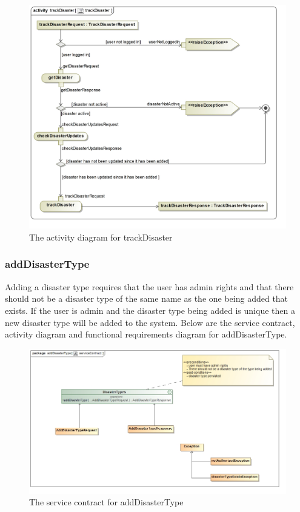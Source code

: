 \begin{figure}[H]
	\centering
	\includegraphics[width=1.0\textwidth]{../images/funcReq/trackDisasterActivityDiagram.jpg}
	\caption{The activity diagram for trackDisaster \label{overflow}}
\end{figure}

\subsubsection{addDisasterType}

Adding a disaster type requires that the user has admin rights and that there should not be a disaster type of the same name as the one being added that exists. If the user is admin and the disaster type being added is unique then a new disaster type will be added to the system. Below are the service contract, activity diagram and functional requirements diagram for addDisasterType.

\begin{figure}[H]
	\centering
	\includegraphics[width=1.0\textwidth]{../images/funcReq/addDisasterTypeServiceContract.jpg}
	\caption{The service contract for addDisasterType \label{overflow}}
\end{figure}

